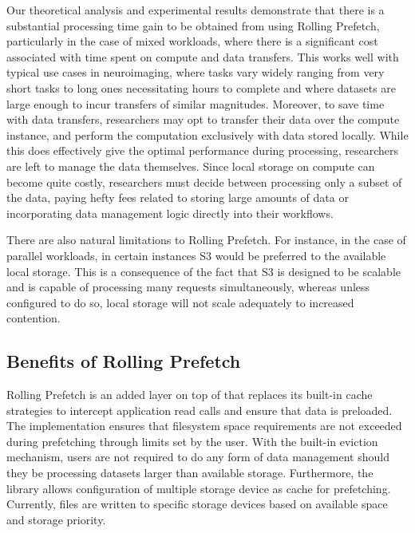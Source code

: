 Our theoretical analysis and experimental results demonstrate that there is a
substantial processing time gain to be obtained from using Rolling Prefetch,
particularly in the case of mixed workloads, where there is a significant cost
associated with time spent on compute and data transfers. This works well with
typical use cases in neuroimaging, where tasks vary widely ranging from very
short tasks to long ones necessitating hours to complete and where datasets are
large enough to incur transfers of similar magnitudes. Moreover, to save time
with data transfers, researchers may opt to transfer their data over the compute
instance, and perform the computation exclusively with data stored locally.
While this does effectively give the optimal performance during processing,
researchers are left to manage the data themselves. Since local storage on
compute can become quite costly, researchers must decide between processing only
a subset of the data, paying hefty fees related to storing large amounts of data
or incorporating data management logic directly into their workflows. 

There are also natural limitations to Rolling Prefetch. For instance, in the
case of parallel workloads, in certain instances S3 would be preferred to the
available local storage. This is a consequence of the fact that S3 is designed
to be scalable and is capable of processing many requests simultaneously,
whereas unless configured to do so, local storage will not scale adequately to
increased contention.


\subsection{Benefits of Rolling Prefetch}

Rolling Prefetch is an added layer on top of \sfs that replaces its built-in
cache strategies to intercept application read calls and ensure that data is
preloaded. The implementation ensures that filesystem space requirements are not
exceeded during prefetching through limits set by the user. With the built-in
eviction mechanism, users are not required to do any form of data management
should they be processing datasets larger than available storage. Furthermore,
the library allows configuration of multiple storage device as cache for
prefetching. Currently, files are written to specific storage devices based on
available space and storage priority.

